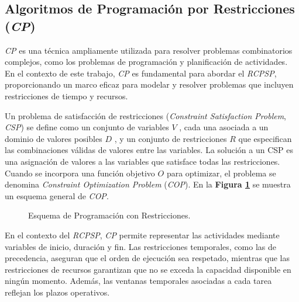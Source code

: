 \documentclass{article}
\begin{document}
\subsection{Algoritmos de Programación por Restricciones (\textit{CP})}

\textit{CP} es una técnica ampliamente utilizada para resolver problemas combinatorios complejos, como los problemas de programación y planificación de actividades. En el contexto de este trabajo, \textit{CP} es fundamental para abordar el \textit{RCPSP}, proporcionando un marco eficaz para modelar y resolver problemas que incluyen restricciones de tiempo y recursos.

Un problema de satisfacción de restricciones (\textit{Constraint Satisfaction Problem}, \textit{CSP}) se define como un conjunto de variables  $V$ , cada una asociada a un dominio de valores posibles  $D$ , y un conjunto de restricciones  $R$  que especifican las combinaciones válidas de valores entre las variables. La solución a un CSP es una asignación de valores a las variables que satisface todas las restricciones. Cuando se incorpora una función objetivo  $O$  para optimizar, el problema se denomina \textit{Constraint Optimization Problem} (\textit{COP})\cite{rossi2006}. En la \textbf{Figura \ref{fig:constraint_programming}} se muestra un esquema general de \textit{COP}.

\begin{figure}[htbp]
\centering
{}
\caption{Esquema de Programación con Restricciones.}
\label{fig:constraint_programming}
\end{figure}

En el contexto del \textit{RCPSP}, \textit{CP} permite representar las actividades mediante variables de inicio, duración y fin. Las restricciones temporales, como las de precedencia, aseguran que el orden de ejecución sea respetado, mientras que las restricciones de recursos garantizan que no se exceda la capacidad disponible en ningún momento. Además, las ventanas temporales asociadas a cada tarea reflejan los plazos operativos.
\end{document}
